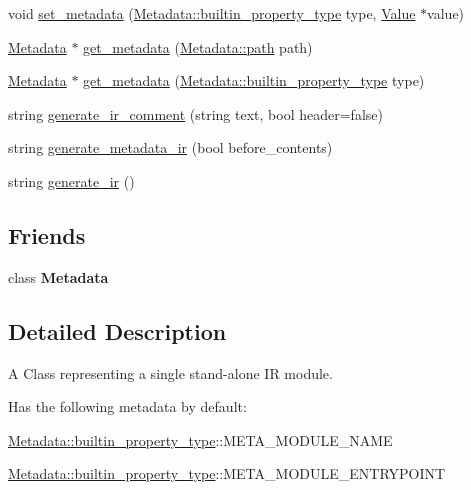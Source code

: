 \begin{DoxyCompactItemize}
void \hyperlink{classeviir_1_1Module_a595290ae9c03680340e20ba068f845de}{set\+\_\+metadata} (\hyperlink{classeviir_1_1Metadata_a372fe4af91ebc18a6d02354e8bcf23cf}{Metadata\+::builtin\+\_\+property\+\_\+type} type, \hyperlink{classeviir_1_1Value}{Value} $\ast$value)
\item 
\hyperlink{classeviir_1_1Metadata}{Metadata} $\ast$ \hyperlink{classeviir_1_1Module_a99eddf2af67228eff3d92ec073fa4941}{get\+\_\+metadata} (\hyperlink{classeviir_1_1Metadata_ac613e5de0552301f9b7969d14eb5dffa}{Metadata\+::path} path)
\item 
\hyperlink{classeviir_1_1Metadata}{Metadata} $\ast$ \hyperlink{classeviir_1_1Module_a75d08de493ea90b6d41b3c53ad856012}{get\+\_\+metadata} (\hyperlink{classeviir_1_1Metadata_a372fe4af91ebc18a6d02354e8bcf23cf}{Metadata\+::builtin\+\_\+property\+\_\+type} type)
\item 
string \hyperlink{classeviir_1_1Module_af0b137a091f26e141482a37904ea069e}{generate\+\_\+ir\+\_\+comment} (string text, bool header=false)
\item 
string \hyperlink{classeviir_1_1Module_a386b1c517ca759e7858ccf09a2411994}{generate\+\_\+metadata\+\_\+ir} (bool before\+\_\+contents)
\item 
string \hyperlink{classeviir_1_1Module_af111f61808e14d845bff062f0d782006}{generate\+\_\+ir} ()
\end{DoxyCompactItemize}
\subsection*{Friends}
\begin{DoxyCompactItemize}
\item 
\mbox{\label{classeviir_1_1Module_aba8d19a917c0bff3a0ab2c135b11b0a4}} 
class {\bfseries Metadata}
\end{DoxyCompactItemize}


\subsection{Detailed Description}
A Class representing a single stand-\/alone IR module. 

Has the following metadata by default\+:
\begin{DoxyItemize}
\item \hyperlink{classeviir_1_1Metadata_a372fe4af91ebc18a6d02354e8bcf23cf}{Metadata\+::builtin\+\_\+property\+\_\+type}\+:\+:{\ttfamily M\+E\+T\+A\+\_\+\+M\+O\+D\+U\+L\+E\+\_\+\+N\+A\+ME}
\item \hyperlink{classeviir_1_1Metadata_a372fe4af91ebc18a6d02354e8bcf23cf}{Metadata\+::builtin\+\_\+property\+\_\+type}\+:\+:{\ttfamily M\+E\+T\+A\+\_\+\+M\+O\+D\+U\+L\+E\+\_\+\+E\+N\+T\+R\+Y\+P\+O\+I\+NT} 
\end{DoxyItemize}

